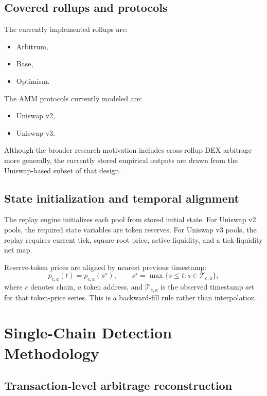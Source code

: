 \documentclass[11pt]{article}
\begin{document}
\subsection{Covered rollups and protocols}

The currently implemented rollups are:
\begin{itemize}[leftmargin=1.5em]
    \item Arbitrum,
    \item Base,
    \item Optimism.
\end{itemize}

The AMM protocols currently modeled are:
\begin{itemize}[leftmargin=1.5em]
    \item Uniswap v2,
    \item Uniswap v3.
\end{itemize}

Although the broader research motivation includes cross-rollup DEX arbitrage more generally, the currently stored empirical outputs are drawn from the Uniswap-based subset of that design.

\subsection{State initialization and temporal alignment}

The replay engine initializes each pool from stored initial state. For Uniswap v2 pools, the required state variables are token reserves. For Uniswap v3 pools, the replay requires current tick, square-root price, active liquidity, and a tick-liquidity net map.

Reserve-token prices are aligned by nearest previous timestamp:
\[
p_{c,a}(t)=p_{c,a}(s^{\star}),
\qquad
s^{\star}=\max\{s\le t:s\in\mathcal{T}_{c,a}\},
\]
where \(c\) denotes chain, \(a\) token address, and \(\mathcal{T}_{c,a}\) is the observed timestamp set for that token-price series. This is a backward-fill rule rather than interpolation.

\section{Single-Chain Detection Methodology}

\subsection{Transaction-level arbitrage reconstruction}
\end{document}
